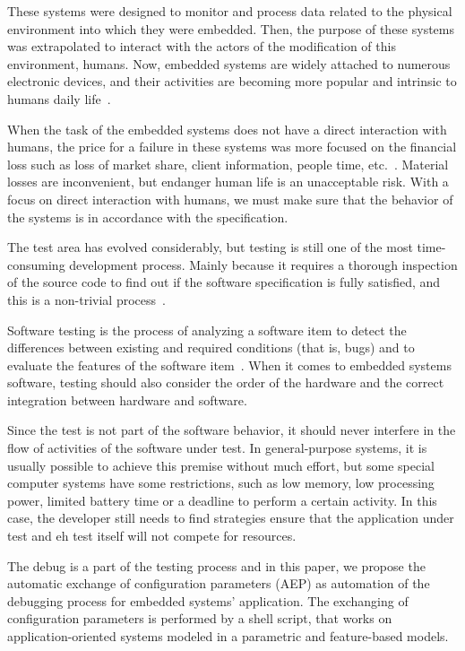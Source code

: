 \documentclass[conference]{IEEEtran}
\begin{document}
These systems were designed to monitor and process data related to the physical environment into which they were embedded. Then, the purpose of these systems was extrapolated to interact with the actors of the modification of this environment, humans. Now, embedded systems are widely attached to numerous electronic devices, and their activities are becoming more popular and intrinsic to humans daily life~\cite{carro2003sistemas}.

When the task of the embedded systems does not have a direct interaction with humans, the price for a failure in these systems was more focused on the financial loss such as loss of market share, client information, people time, etc.~\cite{tassey2002economic}. Material losses are inconvenient, but endanger human life is an unacceptable risk. With a focus on direct interaction with humans, we must make sure that the behavior of the systems is in accordance with the specification.

The test area has evolved considerably, but testing is still one of the most time-consuming development process. Mainly because it requires a thorough inspection of the source code to find out if the software specification is fully satisfied, and this is a non-trivial process~\cite{parnin2011automated}. 

Software testing is the process of analyzing a software item to detect the differences between existing and required conditions (that is, bugs) and to evaluate the features of the software item~\cite{standard:ieee1008:1987}. When it comes to embedded systems software, testing should also consider the order of the hardware and the correct integration between hardware and software.

Since the test is not part of the software behavior, it should never interfere in the flow of activities of the software under test. In general-purpose systems, it is usually possible to achieve this premise  without much effort, but some special computer systems have some restrictions, such as low memory, low processing power, limited battery time or a deadline to perform a certain activity. In this case, the developer still needs to find strategies ensure that the application under test and eh test itself will not compete for resources.

The debug is a part of the testing process and in this paper, we propose the automatic exchange of configuration parameters (AEP) as automation of the debugging process for embedded systems' application.
The exchanging of configuration parameters is performed by a shell script, that works on application-oriented systems modeled in a parametric and feature-based models. 
\end{document}
